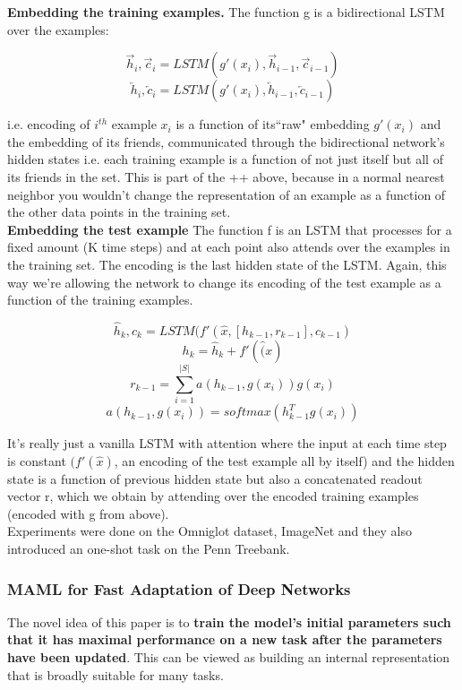 \begin{itemize}
\textbf{Embedding the training examples.} The function g is a bidirectional LSTM over the examples:

$$ \overrightarrow{h}_i, \overrightarrow{c}_i = LSTM(g'(x_i),\overrightarrow{h}_{i-1},\overrightarrow{c}_{i-1})$$
$$\overleftarrow{h}_i, \overleftarrow{c}_i = LSTM(g'(x_i),\overleftarrow{h}_{i-1},\overleftarrow{c}_{i-1})$$

i.e. encoding of $i^{th}$ example $x_i$ is a function of its``raw" embedding $g'(x_i)$ and the embedding of its friends, communicated through the bidirectional network's hidden states i.e. each training example is a function of not just itself but all of its friends in the set. This is part of the ++ above, because in a normal nearest neighbor you wouldn't change the representation of an example as a function of the other data points in the training set.\\

\textbf{Embedding the test example}
The function f is an LSTM that processes for a fixed amount (K time steps) and at each point also attends over the examples in the training set. The encoding is the last hidden state of the LSTM. Again, this way we're allowing the network to change its encoding of the test example as a function of the training examples.

$$\hat{h}_k, c_k = LSTM(f'(\hat{x},[h_{k-1},r_{k-1}], c_{k-1})$$
$$h_k = \hat{h}_k + f'(\hat(x)$$
$$r_{k-1} = \sum_{i=1}^{|S|} a(h_{k-1}, g(x_i))g(x_i)$$
$$ a(h_{k-1}, g(x_i))= softmax(h^T_{k-1}g(x_i))$$

It's really just a vanilla LSTM with attention where the input at each time step is constant $(f'(\hat{x})$, an encoding of the test example all by itself) and the hidden state is a function of previous hidden state but also a concatenated readout vector r, which we obtain by attending over the encoded training examples (encoded with g from above).\\

Experiments were done on the Omniglot dataset, ImageNet and they also introduced an one-shot task on the Penn Treebank.

\end{itemize}

\subsubsection{MAML for Fast Adaptation of Deep Networks} 
The novel idea of this paper\cite{1703.03400} is to \textbf{train the model's initial parameters such that it has maximal performance on a new task after the parameters have been updated}. This can be viewed as building an internal representation that is broadly suitable for many tasks.\\

